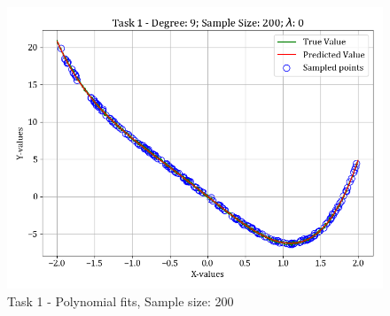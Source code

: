 \documentclass[12pt,a4paper]{article}
\begin{document}
\begin{figure}[H]
    \includegraphics[scale=0.425]{images/t1_d1/d_9_size_200_l_0.png}
    \caption{Task 1 - Polynomial fits, Sample size: 200}
\end{figure}
\end{document}
